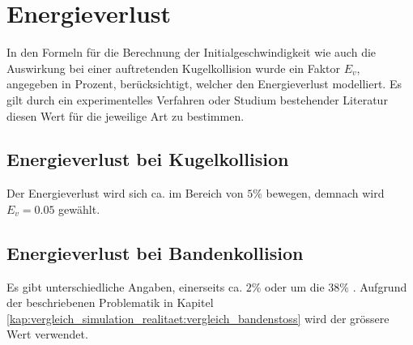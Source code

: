 \newpage
\section{Energieverlust}
In den Formeln für die Berechnung der Initialgeschwindigkeit wie auch die Auswirkung bei einer auftretenden Kugelkollision
wurde ein Faktor $E_v$, angegeben in Prozent, berücksichtigt, welcher den Energieverlust modelliert.
Es gilt durch ein experimentelles Verfahren oder Studium bestehender Literatur diesen Wert für die jeweilige Art zu bestimmen.

\subsection{Energieverlust bei Kugelkollision}
Der Energieverlust wird sich ca. im Bereich von $5\%$ \cite{unikoblenz:entwicklungvirtuellesbillarspiel} bewegen, demnach wird $E_v = 0.05$ gewählt.

\subsection{Energieverlust bei Bandenkollision}
Es gibt unterschiedliche Angaben, einerseits ca. $2\%$ \cite{10.1243/09544062JMES1964} oder um die $38\%$ \cite{billardaktuell:thescienceofpocketbillards}.
Aufgrund der beschriebenen Problematik in Kapitel \ref{kap:vergleich_simulation_realitaet:vergleich_bandenstoss} wird
der grössere Wert verwendet.